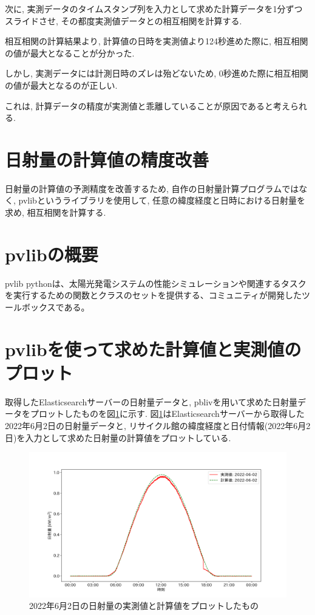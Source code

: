 次に, 実測データのタイムスタンプ列を入力として求めた計算データを1分ずつスライドさせ, その都度実測値データとの相互相関を計算する.

相互相関の計算結果より, 計算値の日時を実測値より124秒進めた際に, 相互相関の値が最大となることが分かった.

しかし, 実測データには計測日時のズレは殆どないため, 0秒進めた際に相互相関の値が最大となるのが正しい.

これは, 計算データの精度が実測値と乖離していることが原因であると考えられる.

\section{日射量の計算値の精度改善}

日射量の計算値の予測精度を改善するため, 自作の日射量計算プログラムではなく, pvlibというライブラリを使用して, 任意の緯度経度と日時における日射量を求め, 相互相関を計算する.

\section{pvlibの概要}
pvlib pythonは、太陽光発電システムの性能シミュレーションや関連するタスクを実行するための関数とクラスのセットを提供する、コミュニティが開発したツールボックスである。

\section{pvlibを使って求めた計算値と実測値のプロット}
取得したElasticsearchサーバーの日射量データと, pblivを用いて求めた日射量データをプロットしたものを図\ref{2-p1}に示す.
図\ref{2-p1}はElasticsearchサーバーから取得した2022年6月2日の日射量データと, リサイクル館の緯度経度と日付情報(2022年6月2日)を入力として求めた日射量の計算値をプロットしている.

\begin{figure}
  \begin{center}
    \includegraphics[width=160mm]{sotu/figure/2/pvlib-20220602-corr.png}
    \caption{2022年6月2日の日射量の実測値と計算値をプロットしたもの}
    \label{2-p1}
  \end{center}
\end{figure}

